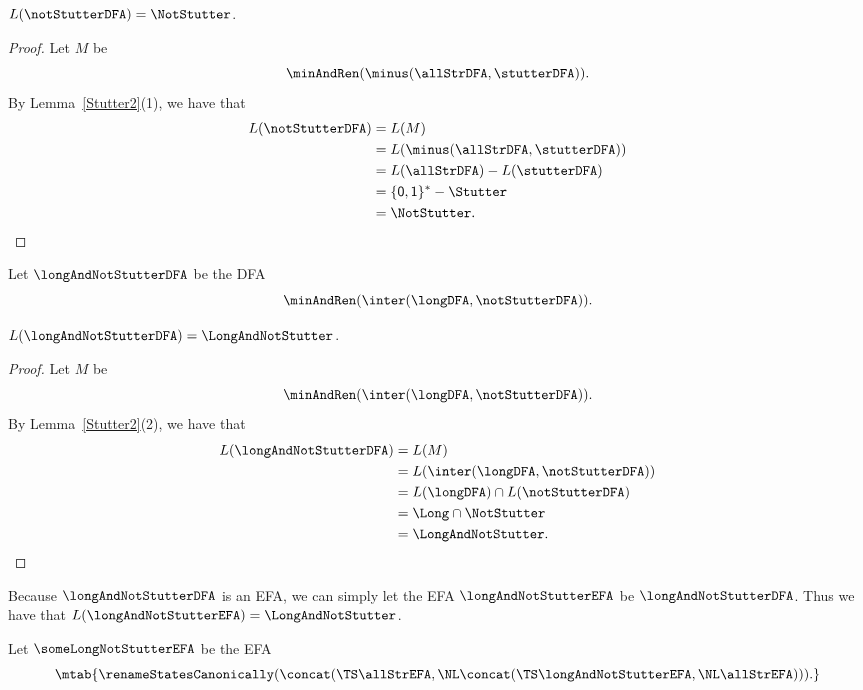 \begin{lemma}
\label{Stutter8}
$L(\notStutterDFA) = \NotStutter$.
\end{lemma}

\begin{proof}
Let $M$ be
\begin{displaymath}
\minAndRen(\minus(\allStrDFA, \stutterDFA)) .
\end{displaymath}
By Lemma~\ref{Stutter2}(1), we have that
\begin{align*}
L(\notStutterDFA) &= L(M) \\
&= L(\minus(\allStrDFA, \stutterDFA)) \\
&= L(\allStrDFA) - L(\stutterDFA) \\
&= \{\mathsf{0,1}\}^* - \Stutter \\
&= \NotStutter .
\end{align*}
\end{proof}

Let $\longAndNotStutterDFA$ be the DFA
\begin{displaymath}
\minAndRen(\inter(\longDFA, \notStutterDFA)) .
\end{displaymath}
%
%

\begin{lemma}
\label{Stutter9}
$L(\longAndNotStutterDFA) = \LongAndNotStutter$.
\end{lemma}

\begin{proof}
Let $M$ be
\begin{displaymath}
\minAndRen(\inter(\longDFA, \notStutterDFA)) .
\end{displaymath}
By Lemma~\ref{Stutter2}(2), we have that
\begin{align*}
L(\longAndNotStutterDFA) &= L(M) \\
&= L(\inter(\longDFA, \notStutterDFA)) \\
&= L(\longDFA)\cap L(\notStutterDFA) \\
&= \Long\cap\NotStutter \\
&= \LongAndNotStutter .
\end{align*}
\end{proof}

Because $\longAndNotStutterDFA$ is an EFA, we can simply let
the EFA $\longAndNotStutterEFA$ be
$\longAndNotStutterDFA$.  Thus we have that
$L(\longAndNotStutterEFA) = \LongAndNotStutter$.

Let $\someLongNotStutterEFA$ be the EFA
\begin{displaymath}
\mtab{
\renameStatesCanonically(\concat(\TS\allStrEFA, \NL
                                 \concat(\TS\longAndNotStutterEFA, \NL
                                             \allStrEFA))).}
\end{displaymath}
%
%
%
%

